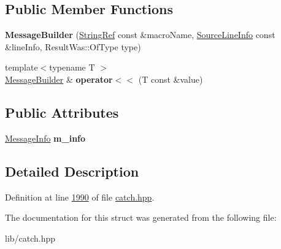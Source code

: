 \subsection*{Public Member Functions}
\begin{DoxyCompactItemize}
\item 
\mbox{\label{structCatch_1_1MessageBuilder_ac34832ca527a758f000ac233d32dd068}} 
{\bfseries Message\+Builder} (\mbox{\hyperlink{classCatch_1_1StringRef}{String\+Ref}} const \&macro\+Name, \mbox{\hyperlink{structCatch_1_1SourceLineInfo}{Source\+Line\+Info}} const \&line\+Info, Result\+Was\+::\+Of\+Type type)
\item 
\mbox{\label{structCatch_1_1MessageBuilder_a20fa48d069b20dddcc2d3df8abb123c1}} 
{\footnotesize template$<$typename T $>$ }\\\mbox{\hyperlink{structCatch_1_1MessageBuilder}{Message\+Builder}} \& {\bfseries operator$<$$<$} (T const \&value)
\end{DoxyCompactItemize}
\subsection*{Public Attributes}
\begin{DoxyCompactItemize}
\item 
\mbox{\label{structCatch_1_1MessageBuilder_a979f1c2b36d78f80ee275bfa5ba0209f}} 
\mbox{\hyperlink{structCatch_1_1MessageInfo}{Message\+Info}} {\bfseries m\+\_\+info}
\end{DoxyCompactItemize}


\subsection{Detailed Description}


Definition at line \mbox{\hyperlink{catch_8hpp_source_l01990}{1990}} of file \mbox{\hyperlink{catch_8hpp_source}{catch.\+hpp}}.



The documentation for this struct was generated from the following file\+:\begin{DoxyCompactItemize}
\item 
lib/catch.\+hpp\end{DoxyCompactItemize}
